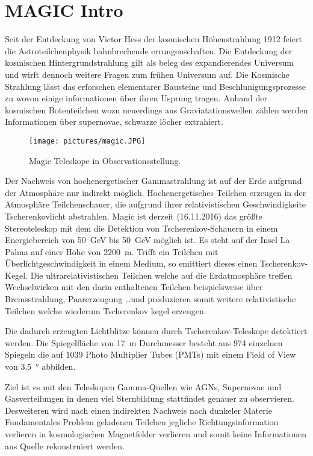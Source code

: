 \section{MAGIC Intro}%
\label{sec:magic}
Seit der Entdeckung von Victor Hess der kosmischen Höhenstrahlung 
1912 feiert die Astroteilchenphysik bahnbrechende errungenschaften.
Die Entdeckung der kosmischen Hintergrundstrahlung gilt als beleg des
expandierendes Universum und wirft dennoch weitere Fragen zum frühen Universum auf. 
Die Kosmische Strahlung lässt das erforschen elementarer Bausteine und
Beschlunigungsprozesse zu wovon
einige informationen über ihren Usprung tragen. 
Anhand der kosmischen Botenteilchen wozu neuerdings aus Graviatationswellen
zählen werden Informationen über supernovae, schwarze löcher extrahiert.
\begin{wrapfigure}[13]{o}{0.45\textwidth}
		\texttt{[image: pictures/magic.JPG]}
		\caption{Magic Teleskope in Observationsstellung.}%
		\label{fig:magic}
\end{wrapfigure}
Der Nachweis von hochenergetischer Gammastrahlung ist auf der Erde aufgrund der
Atmosphäre nur indirekt möglich. 
Hochenergetisches Teilchen erzeugen in der Atmosphäre Teilchenschauer, die
aufgrund ihrer relativistischen Geschwindigkeite Tscherenkovlicht abstrahlen.
Magic ist derzeit (16.11.2016) das größte Stereoteleskop mit dem die
Detektion von Tscherenkov-Schauern in einem Energiebereich von
\SI{50}{\giga\electronvolt} bis \SI{50}{\giga\electronvolt} möglich ist.
Es steht auf der Insel La Palma auf einer Höhe von \SI{2200}{\meter}.
Trifft ein Teilchen mit Überlichtgeschwindigkeit in einem Medium, so emittiert
dieses einen Tscherenkov-Kegel. 
Die ultrarelativistischen Teilchen welche auf die Erdatmosphäre treffen
Wechselwirken mit den darin enthaltenen Teilchen beispielsweise über
Bremsstrahlung, Paarerzeugung \ldots und produzieren somit weitere
relativistische Teilchen welche wiederum Tscherenkov kegel erzeugen.

Die dadurch erzeugten Lichtblitze können durch Tscherenkov-Teleskope detektiert
werden.
Die Spiegelfläche von \SI{17}{\meter} Durchmesser besteht aus \num{974} einzelnen
Spiegeln die auf \num{1039} Photo Multiplier Tubes (PMTs) mit einem
Field of View von \SI{3.5}{\degree} abbilden. 

Ziel ist es mit den Teleskopen Gamma-Quellen wie AGNs, Supernovae und
Gasverteilungen in denen viel Sternbildung stattfindet genauer zu observieren. 
Desweiteren wird nach einen indirekten Nachweis nach dunkeler Materie 
Fundamentales Problem geladenen Teilchen jegliche Richtungsinformation verlieren
in kosmologischen Magnetfelder verlieren und somit keine Informationen aus
Quelle rekonstruiert werden. 

\clearpage

